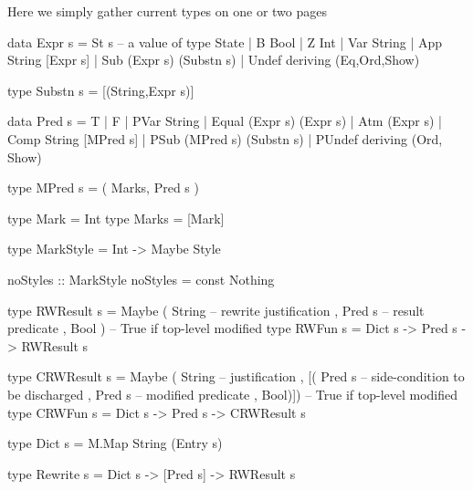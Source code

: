 \label{ha:calc-types-txt}

Here we simply gather current types on one or two pages
\begin{code}
data Expr s
 = St s  -- a value of type State
 | B Bool
 | Z Int
 | Var String
 | App String [Expr s]
 | Sub (Expr s) (Substn s)
 | Undef
 deriving (Eq,Ord,Show)

type Substn s = [(String,Expr s)]
\end{code}

\begin{code}
data Pred s
 = T
 | F
 | PVar String
 | Equal (Expr s) (Expr s)
 | Atm (Expr s)
 | Comp String [MPred s]
 | PSub (MPred s) (Substn s)
 | PUndef
 deriving (Ord, Show)
\end{code}

\begin{code}
type MPred s = ( Marks, Pred s )

type Mark = Int
type Marks = [Mark]
\end{code}

\begin{code}
type MarkStyle = Int -> Maybe Style

noStyles :: MarkStyle
noStyles = const Nothing
\end{code}

\begin{code}
type RWResult s
 = Maybe ( String  -- rewrite justification
         , Pred s  -- result predicate
         , Bool )  -- True if top-level modified
type RWFun s = Dict s -> Pred s -> RWResult s
\end{code}

\begin{code}
type CRWResult s
 = Maybe ( String      -- justification
         , [( Pred s   -- side-condition to be discharged
            , Pred s  -- modified predicate
            , Bool)])  -- True if top-level modified
type CRWFun s = Dict s -> Pred s -> CRWResult s
\end{code}

\begin{code}
type Dict s = M.Map String (Entry s)
\end{code}

\begin{code}
type Rewrite s = Dict s -> [Pred s] -> RWResult s
\end{code}

